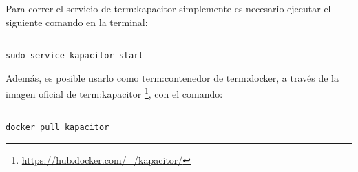 Para correr el servicio de \gls{term:kapacitor} simplemente es necesario
ejecutar el siguiente comando en la terminal:

\begin{lstlisting}

sudo service kapacitor start

\end{lstlisting}

Además, es posible usarlo como \gls{term:contenedor} de \gls{term:docker},
a través de la imagen oficial de \gls{term:kapacitor}
\footnote{\url{https://hub.docker.com/_/kapacitor/}}, con el comando:

\begin{lstlisting}

docker pull kapacitor

\end{lstlisting}
